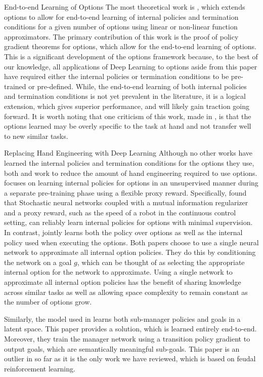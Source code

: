 \begin{subsection}{End-to-end Learning of Options}
The most theoretical work is \cite{Bacon}, which extends options to allow for end-to-end learning
of internal policies and termination conditions for a given number of options using
linear or non-linear function approximators. The primary contribution of this work is the proof
of policy gradient theorems for options, which allow for the end-to-end learning of options.
This is a significant development of the options framework because, to the best of our knowledge,
all applications of Deep Learning to options aside from this paper have required either the internal policies
or termination conditions to be pre-trained or pre-defined. While, the end-to-end learning of both internal policies
and termination conditions is not yet prevalent in the literature, it is a logical extension, which gives superior
performance, and will likely gain traction going forward. It is worth noting that one criticism of this work,
made in \cite{Florensa}, is that the options learned may be overly specific to the task at hand and not transfer well
to new similar tasks.
\end{subsection}

\begin{subsection}{Replacing Hand Engineering with Deep Learning}
Although no other works have learned the internal policies and termination conditions
for the options they use, both \cite{Tejas} and
\cite{Florensa} work to reduce the amount of hand engineering required
to use options. \cite{Florensa} focuses on learning internal policies for options in an unsupervised manner
during a separate pre-training phase using a flexible proxy reward.
Specifically, \cite{Florensa} found that Stochastic neural networks coupled with
a mutual information regularizer and a proxy reward, such as the speed of a
robot in the continuous control setting, can reliably learn internal policies for
options with minimal supervision. In contrast,
\cite{Tejas} jointly learns both the policy over options
as well as the internal policy used when executing the options. Both papers choose to
use a single neural network to approximate all internal option policies. They do this
by conditioning the network on a goal $g$, which can be thought of as selecting the
appropriate internal option for the network to approximate. Using a single network
to approximate all internal option policies has the benefit of sharing knowledge
across similar tasks as well as allowing space complexity to remain constant as
the number of options grow.

Similarly, the model used in \cite{Vezhnevets} learns both sub-manager policies and
goals in a latent space. This paper provides a solution, which is learned entirely
end-to-end. Moreover, they train the manager network using a transition
policy gradient to output goals, which are semantically meaningful sub-goals.
This paper is an outlier in so far as it is the only work we have
reviewed, which is based on feudal reinforcement learning.
\end{subsection}

